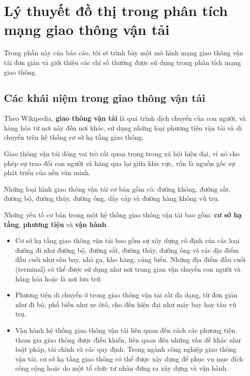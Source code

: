\documentclass[14pt, oneside, a4paper, openany]{scrartcl}
\begin{document}
\section{Lý thuyết đồ thị trong phân tích mạng giao thông vận tải}
Trong phần này của báo cáo, tôi sẽ trình bày một mô hình mạng giao thông vận tải đơn giản và giới thiệu các chỉ số thường được sử dụng trong phân tích mạng giao thông. 

\subsection{Các khái niệm trong giao thông vận tải}
Theo Wikipedia, \textbf{giao thông vận tải}  là quá trình dịch chuyển của con người, và hàng hóa từ nơi này đến nơi khác, sử dụng những loại phương tiện vận tải và di chuyển trên hệ thống cơ sở hạ tầng giao thông. 

Giao thông vận tải đóng vai trò rất quan trọng trong xã hội hiện đại, vì nó cho phép sự trao đổi con người và hàng qua lại giữa khu vực, vốn là nguồn gốc sự phát triển của nền văn minh.

Những loại hình giao thông vận tải cơ bản gồm có: đường không, đường sắt, đường bộ, đường thủy, đường ống, dây cáp và đường hàng không vũ trụ. 

Những yếu tố cơ bản trong một hệ thống giao thông vận tải bao gồm: \textbf{cơ sở hạ tầng}, \textbf{phương tiện} và \textbf{vận hành}.
\begin{itemize}
	\item Cơ sở hạ tầng giao thông vận tải bao gồm sự xây dựng cố định của các loại đường đi như đường bộ, đường sắt, đường thủy, đường ống và các địa điểm đầu cuối như sân bay, nhà ga, kho hàng, cảng biển. Những địa điểm đầu cuối (terminal) có thể được sử dụng như nơi trung gian vận chuyển con người và hàng hóa hoặc là nơi lưu trữ.
	\item Phương tiện di chuyển ở trong giao thông vận tải rất đa dạng, từ đơn giản như đi bộ, phổ biến như xe ôtô, cho đến hiện đại như máy bay hay tàu vũ trụ.
	\item Vận hành hệ thống giao thông vận tải liên quan đến cách các phương tiện tham gia giao thông được điều khiển, liên quan đến những vấn đề khác như luật pháp, tài chính và các quy định. Trong ngành công nghiệp giao thông vận tải, cơ sở hạ tầng giao thông có thể được xây dựng để phục vụ mục đích công cộng hoặc do một tổ chức tư nhân đứng ra xây dựng và vận hành.
\end{itemize}
\end{document}
